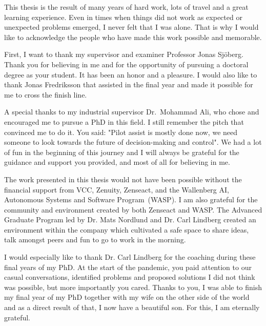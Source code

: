 


This thesis is the result of many years of hard work, lots of travel and a great learning experience. Even in times when things did not work as expected or unexpected problems emerged, I never felt that I was alone. That is why I would like to acknowledge the people who have made this work possible and memorable. 

First, I want to thank my supervisor and examiner Professor Jonas Sj\"oberg. 
Thank you for believing in me and for the opportunity of pursuing a doctoral degree as your student. It has been an honor and a pleasure. I would also like to thank Jonas Fredriksson that assisted in the final year and made it possible for me to cross the finish line. 

A special thanks to my industrial supervisor Dr.~Mohammad Ali, who chose and encouraged me to pursue a PhD in this field. I still remember the pitch that convinced me to do it. You said: "Pilot assist is mostly done now, we need someone to look towards the future of decision-making and control". We had a lot of fun in the beginning of this journey and I will always be grateful for the guidance and support you provided, and most of all for believing in me. 

The work presented in this thesis would not have been possible without the financial support from VCC, Zenuity, Zenseact, and the Wallenberg AI, Autonomous Systems and Software Program~(WASP). I am also grateful for the community and environment created by both Zenseact and WASP. The Advanced Graduate Program led by Dr. Mats Nordlund and Dr. Carl Lindberg created an environment within the company which cultivated a safe space to share ideas, talk amongst peers and fun to go to work in the morning. 

I would especially like to thank Dr. Carl Lindberg for the coaching during these final years of my PhD. At the start of the pandemic, you paid attention to our casual conversations, identified problems and proposed solutions I did not think was possible, but more importantly you cared. Thanks to you, I was able to finish my final year of my PhD together with my wife on the other side of the world and as a direct result of that, I now have a beautiful son. For this, I am eternally grateful. 
 
